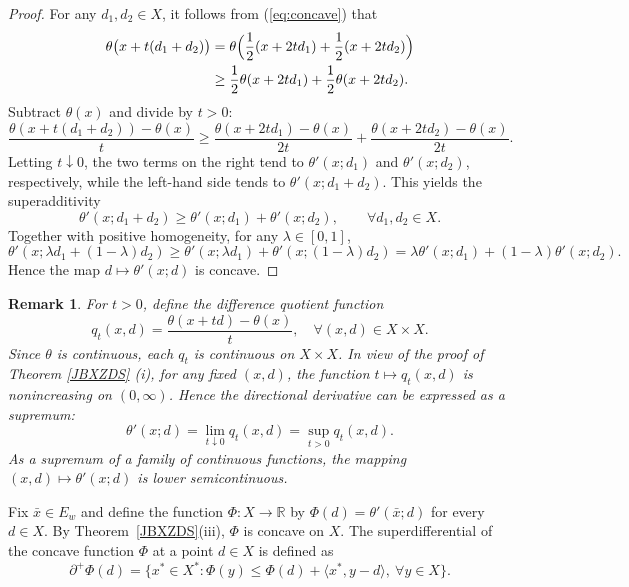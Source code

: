 \documentclass[11pt]{article}
\newtheorem{remark}{Remark}[section]
\begin{document}
\begin{proof}
 
	For any $d_1,d_2\in X$,   it follows from  (\ref{eq:concave})  that
	\[
	\begin{aligned}
		\theta\bigl(x+t(d_1+d_2)\bigr)
		&= \theta\Bigl(\frac{1}{2}(x+2td_1)+\frac{1}{2}(x+2td_2)\Bigr)\\
		&\ge \frac{1}{2}\theta(x+2td_1) + \frac{1}{2}\theta(x+2td_2).
	\end{aligned}
	\]
	Subtract $\theta(x)$ and divide by $t>0$:
	\[
	\frac{\theta(x+t(d_1+d_2))-\theta(x)}{t}
	\ge \frac{\theta(x+2td_1)-\theta(x)}{2t} + \frac{\theta(x+2td_2)-\theta(x)}{2t}.
	\]
	Letting $t\downarrow0$, the two terms on the right tend to $\theta'(x;d_1)$ and $\theta'(x;d_2)$, respectively,
	while the left-hand side tends to $\theta'(x;d_1+d_2)$. This yields the superadditivity
	$$		\theta'(x;d_1+d_2) \ge \theta'(x;d_1) + \theta'(x;d_2),\qquad \forall d_1,d_2\in X.	$$
	Together with positive homogeneity, for any $\lambda\in[0,1]$,
	\[
	\theta'(x;\lambda d_1+(1-\lambda)d_2)
	\ge \theta'(x;\lambda d_1) + \theta'(x;(1-\lambda)d_2)
	= \lambda\theta'(x;d_1) + (1-\lambda)\theta'(x;d_2).
	\]
	Hence the map $d\mapsto\theta'(x;d)$ is concave.
	\end{proof}




\begin{remark}    \label{RsxfQ} For \(t > 0\), define the difference quotient function
	\[
	q_t(x, d) = \frac{\theta(x + t d) - \theta(x)}{t},   \quad  \forall (x, d) \in X \times X.
	\]
	Since \(\theta\) is continuous, each \(q_t\) is continuous on \(X \times X\).     In view of  the proof of Theorem  \ref{JBXZDS} (i), for any fixed \((x, d)\), the function \(t \mapsto q_t(x,d)\) is nonincreasing on \((0,\infty)\). Hence the directional derivative can be expressed as a supremum:
	\[
	\theta'(x; d) = \lim_{t \downarrow 0} q_t(x,d) = \sup_{t > 0} q_t(x,d).
	\]
	As a supremum of a family of continuous functions, the mapping \((x,d) \mapsto \theta'(x;d)\) is lower semicontinuous.
 \end{remark}

  

Fix $\bar{x} \in E_w$ and define the function $\Phi : X \to \mathbb{R}$ by $\Phi(d) = \theta'(\bar{x}; d)$ for every $d \in X$.  
By Theorem~\ref{JBXZDS}(iii), $\Phi$ is concave on $X$.  
The superdifferential of the concave function $\Phi$ at a point $d \in X$ is defined as
\[
\partial^+ \Phi(d) = \{ x^* \in X^* : \Phi(y) \le \Phi(d) + \langle x^*, y-d \rangle,\ \forall y \in X \}.
\]
\end{document}
